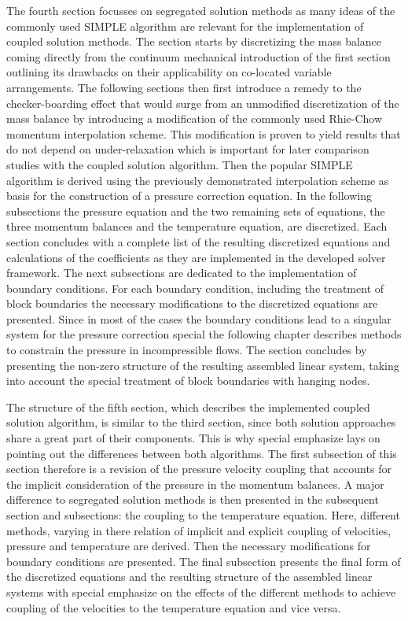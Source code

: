 The fourth section focusses on segregated solution methods as many ideas of the commonly used SIMPLE algorithm are relevant for the implementation of coupled solution methods. The section starts by discretizing the mass balance coming directly from the continuum mechanical introduction of the first section outlining its drawbacks on their applicability on co-located variable arrangements. The following sections then first introduce a remedy to the checker-boarding effect that would surge from an unmodified discretization of the mass balance by introducing a modification of the commonly used Rhie-Chow \cite{rhie82} momentum interpolation scheme. This modification is proven to yield results that do not depend on under-relaxation which is important for later comparison studies with the coupled solution algorithm. Then the popular SIMPLE algorithm is derived using the previously demonstrated interpolation scheme as basis for the construction of a pressure correction equation. In the following subsections the pressure equation and the two remaining sets of equations, the three momentum balances and the temperature equation, are discretized. Each section concludes with a complete list of the resulting discretized equations and calculations of the coefficients as they are implemented in the developed solver framework. The next subsections are dedicated to the implementation of boundary conditions. For each boundary condition, including the treatment of block boundaries the necessary modifications to the discretized equations are presented. Since in most of the cases the boundary conditions lead to a singular system for the pressure correction special the following chapter describes methods to constrain the pressure in incompressible flows. The section concludes by presenting the non-zero structure of the resulting assembled linear system, taking into account the special treatment of block boundaries with hanging nodes.

The structure of the fifth section, which describes the implemented coupled solution algorithm, is similar to the third section, since both solution approaches share a great part of their components. This is why special emphasize lays on pointing out the differences between both algorithms. The first subsection of this section therefore is a revision of the pressure velocity coupling that accounts for the implicit consideration of the pressure in the momentum balances. A major difference to segregated solution methods is then presented in the subsequent section and subsections: the coupling to the temperature equation. Here, different methods, varying in there relation of implicit and explicit coupling of velocities, pressure and temperature are derived. Then the necessary modifications for boundary conditions are presented. The final subsection presents the final form of the discretized equations and the resulting structure of the assembled linear systems with special emphasize on the effects of the different methods to achieve coupling of the velocities to the temperature equation and vice versa.

